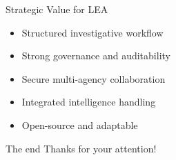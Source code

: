 \documentclass[10pt,aspectratio=169, colorlinks=true, linkcolor=circlBlue]{beamer}
\begin{document}
\begin{frame}{Strategic Value for LEA}
	\begin{itemize}
		\item Structured investigative workflow
		\item Strong governance and auditability
		\item Secure multi-agency collaboration
		\item Integrated intelligence handling
		\item Open-source and adaptable
	\end{itemize}
\end{frame}

\begin{frame}{The end}
	\centering
	\Large
	Thanks for your attention!\\
	\bigskip
\end{frame}
\end{document}
